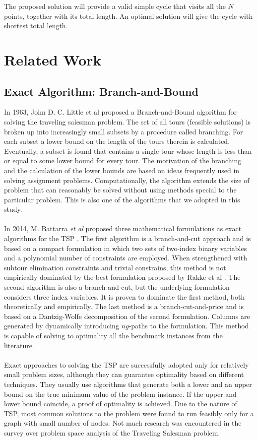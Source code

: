 The proposed solution will provide a valid simple cycle that visits all the $N$ points, together with its total length. An optimal solution will give the cycle with shortest total length.



\section{Related Work}
\subsection{Exact Algorithm: Branch-and-Bound}
In 1963, John D. C. Little et al \cite{Little1963} proposed a Branch-and-Bound algorithm for solving the traveling salesman problem. The set of all tours (feasible solutions) is broken up into increasingly small subsets by a procedure called branching. For each subset a lower bound on the length of the tours therein is calculated. Eventually, a subset is found that contains a single tour whose length is less than or equal to some lower bound for every tour. The motivation of the branching and the calculation of the lower bounds are based on ideas frequently used in solving assignment problems. Computationally, the algorithm extends the size of problem that can reasonably be solved without using methods special to the particular problem. This is also one of the algorithms that we adopted in this study.\\
\\
In 2014, M. Battarra \textit{et al} proposed three mathematical formulations as exact algorithms for the TSP \cite{Battarra2014}. The first algorithm is a branch-and-cut approach and is based on a compact formulation in which two sets of two-index binary variables and a polynomial number of constraints are employed. When strengthened with subtour elimination constraints and trivial constrains, this method is not empirically dominated by the best formulation proposed by Rakke et al \cite{glomvik2012}. The second algorithm is also a branch-and-cut, but the underlying formulation considers three index variables. It is proven to dominate the first method, both theoretically and empirically. The last method is a branch-cut-and-price and is based on a Dantzig-Wolfe decomposition of the second formulation. Columns are generated by dynamically introducing $ng$-paths to the formulation. This method is capable of solving to optimality all the benchmark instances from the literature.\\
\\
Exact approaches to solving the TSP are successfully
adopted only for relatively small problem sizes, although they can guarantee optimality based on different techniques. They usually use algorithms that generate both a lower and an upper bound on the true minimum value of the problem instance. If the upper and lower bound coincide, a proof of optimality is achieved. 
Due to the nature of TSP, most common solutions to
the problem were found to run feasibly only for a graph
with small number of nodes. Not much research was
encountered in the survey over problem space analysis of
the Traveling Salesman problem.

